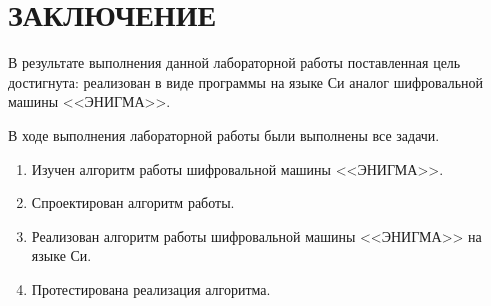 \chapter*{ЗАКЛЮЧЕНИЕ}

В результате выполнения данной лабораторной работы поставленная цель достигнута: реализован в виде программы на языке Си аналог шифровальной машины  <<ЭНИГМА>>.

В ходе выполнения лабораторной работы были выполнены все задачи.

\begin{enumerate}[label=\arabic*)]
	\item Изучен алгоритм работы шифровальной машины <<ЭНИГМА>>.
	\item Спроектирован алгоритм работы.
	\item Реализован алгоритм работы шифровальной машины <<ЭНИГМА>> на языке Си.
	\item Протестирована реализация алгоритма.
\end{enumerate}
